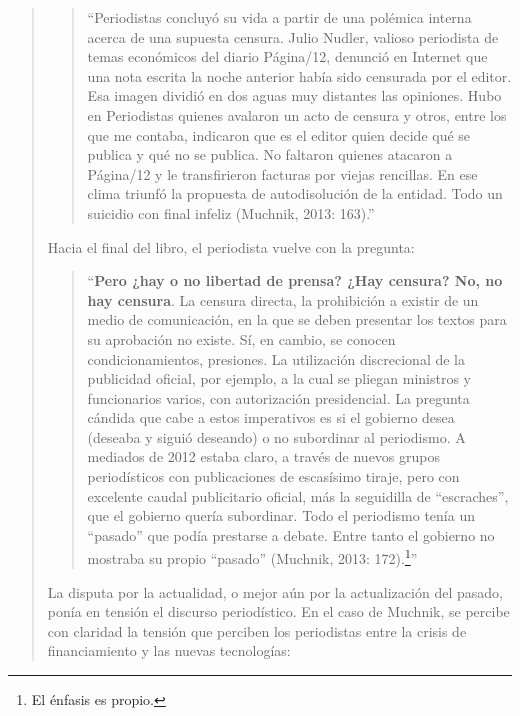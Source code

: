 \begin{quote}
\begin{quote}
	\enquote{Periodistas concluyó su vida a partir de una polémica interna acerca de una supuesta censura. Julio Nudler, valioso periodista de temas económicos del diario Página/12, denunció en Internet que una nota escrita la noche anterior había sido censurada por el editor. Esa imagen dividió en dos aguas muy distantes las opiniones. Hubo en Periodistas quienes avalaron un acto de censura y otros, entre los que me contaba, indicaron que es el editor quien decide qué se publica y qué no se publica. No faltaron quienes atacaron a Página/12 y le transfirieron facturas por viejas rencillas. En ese clima triunfó la propuesta de autodisolución de la entidad. Todo un suicidio con final infeliz (Muchnik, 2013: 163).}
\end{quote}


Hacia el final del libro, el periodista vuelve con la pregunta:

\begin{quote}
	\enquote{\textbf{Pero ¿hay o no libertad de prensa? ¿Hay censura? No, no hay censura}. La censura directa, la prohibición a existir de un medio de comunicación, en la que se deben presentar los textos para su aprobación no existe. Sí, en cambio, se conocen condicionamientos, presiones. La utilización discrecional de la publicidad oficial, por ejemplo, a la cual se pliegan ministros y funcionarios varios, con autorización presidencial. La pregunta cándida que cabe a estos imperativos es si el gobierno desea (deseaba y siguió deseando) o no subordinar al periodismo. A mediados de 2012 estaba claro, a través de nuevos grupos periodísticos con publicaciones de escasísimo tiraje, pero con excelente caudal publicitario oficial, más la seguidilla de ``escraches'', que el gobierno quería subordinar. Todo el periodismo tenía un ``pasado'' que podía prestarse a debate. Entre tanto el gobierno no mostraba su propio ``pasado'' (Muchnik, 2013: 172).\footnote{El énfasis es propio.}}
\end{quote}


La disputa por la actualidad, o mejor aún por la actualización del pasado, ponía en tensión el discurso periodístico. En el caso de Muchnik, se percibe con claridad la tensión que perciben los periodistas entre la crisis de financiamiento y las nuevas tecnologías:


\end{quote}
